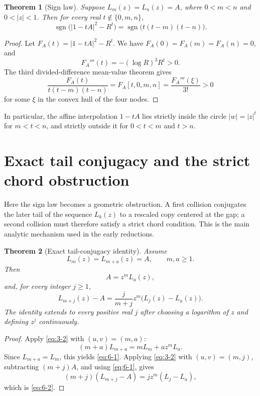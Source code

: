 \documentclass[11pt]{article}
\numberwithin{equation}{section}
\newtheorem{theorem}{Theorem}[section]
\theoremstyle{definition}
\begin{document}
\begin{theorem}[Sign law]\label{thm:sign}
Suppose \(L_m(z)=L_n(z)=A\), where \(0<m<n\) and \(0<|z|<1\).  Then for every
real \(t\notin\{0,m,n\}\),
\[
 \operatorname{sgn}\bigl(|1-tA|^2-R^t\bigr)
 =\operatorname{sgn}\bigl(t(t-m)(t-n)\bigr).
 \label{eq:5-1}
\]
\end{theorem}

\begin{proof}
Let \(F_A(t)=|1-tA|^2-R^t\).  We have
\(F_A(0)=F_A(m)=F_A(n)=0\), and
\[
 F_A'''(t)=-(\log R)^3R^t>0.
\]
The third divided-difference mean-value theorem gives
\[
 \frac{F_A(t)}{t(t-m)(t-n)}
 =F_A[t,0,m,n]=\frac{F_A'''(\xi)}{3!}>0
\]
for some \(\xi\) in the convex hull of the four nodes.
\end{proof}

In particular, the affine interpolation \(1-tA\) lies strictly inside the
circle \(|w|=|z|^t\) for \(m<t<n\), and strictly outside it for
\(0<t<m\) and \(t>n\).

\section{Exact tail conjugacy and the strict chord obstruction}
\label{sec:tail}

Here the sign law becomes a geometric obstruction.  A first collision conjugates the later tail of the sequence \(L_k(z)\) to a rescaled copy centered at the gap; a second collision must therefore satisfy a strict chord condition.  This is the main analytic mechanism used in the early reductions.

\begin{theorem}[Exact tail-conjugacy identity]\label{thm:tail}
Assume
\[
 L_m(z)=L_{m+a}(z)=A,
 \qquad m,a\geq1.
\]
Then
\begin{equation}
 A=z^mL_a(z),
 \label{eq:6-1}
\end{equation}
and, for every integer \(j\geq1\),
\begin{equation}
 L_{m+j}(z)-A
 =\frac{j}{m+j}z^m\bigl(L_j(z)-L_a(z)\bigr).
 \label{eq:6-2}
\end{equation}
The identity extends to every positive real \(j\) after choosing a logarithm
of \(z\) and defining \(z^j\) continuously.
\end{theorem}

\begin{proof}
Apply \eqref{eq:3-2} with \((u,v)=(m,a)\):
\[
 (m+a)L_{m+a}=mL_m+az^mL_a.
\]
Since \(L_{m+a}=L_m\), this yields \eqref{eq:6-1}.  Applying \eqref{eq:3-2} with
\((u,v)=(m,j)\), subtracting \((m+j)A\), and using \eqref{eq:6-1}, gives
\[
 (m+j)(L_{m+j}-A)=jz^m(L_j-L_a),
\]
which is \eqref{eq:6-2}.
\end{proof}
\end{document}
